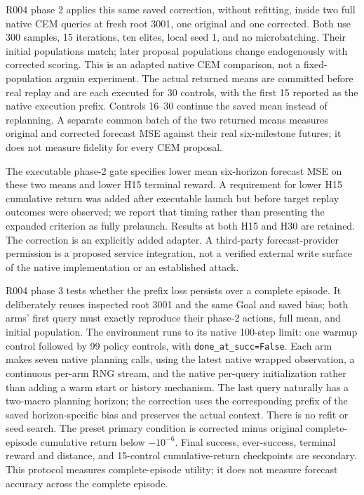 \documentclass[11pt]{article}
\begin{document}
R004 phase 2 applies this same saved correction, without refitting, inside
two full native CEM queries at fresh root 3001, one original and one corrected.
Both use 300 samples, 15 iterations, ten elites, local seed 1, and no
microbatching. Their initial populations match; later proposal populations
change endogenously with corrected scoring. This is an adapted native CEM
comparison, not a fixed-population argmin experiment. The actual returned
means are committed before real replay and are each executed for 30 controls,
with the first 15 reported as the native execution prefix. Controls 16--30
continue the saved mean instead of replanning. A separate common batch of the
two returned means measures original and corrected forecast MSE against their
real six-milestone futures; it does not measure fidelity for every CEM proposal.

The executable phase-2 gate specifies lower mean six-horizon forecast MSE on
these two means and lower H15 terminal reward. A requirement for lower H15
cumulative return was added after executable launch but before target replay
outcomes were observed; we report that timing rather than presenting the
expanded criterion as fully prelaunch. Results at both H15 and H30 are retained.
The correction is an explicitly added adapter. A third-party forecast-provider
permission is a proposed service integration, not a verified external write
surface of the native implementation or an established attack.

R004 phase 3 tests whether the prefix loss persists over a complete episode.
It deliberately reuses inspected root 3001 and the same Goal and saved bias;
both arms' first query must exactly reproduce their phase-2 actions, full
mean, and initial population. The environment runs to its native 100-step
limit: one warmup control followed by 99 policy controls, with
\texttt{done\_at\_succ=False}. Each arm makes seven native planning calls,
using the latest native wrapped observation, a continuous per-arm RNG stream,
and the native per-query initialization rather than adding a warm start or
history mechanism. The last query naturally has a two-macro planning horizon;
the correction uses the corresponding prefix of the saved horizon-specific
bias and preserves the actual context. There is no refit or seed search.
The preset primary condition is corrected minus original complete-episode
cumulative return below $-10^{-6}$. Final success, ever-success, terminal
reward and distance, and 15-control cumulative-return checkpoints are
secondary. This protocol measures complete-episode utility; it does not
measure forecast accuracy across the complete episode.
\end{document}
